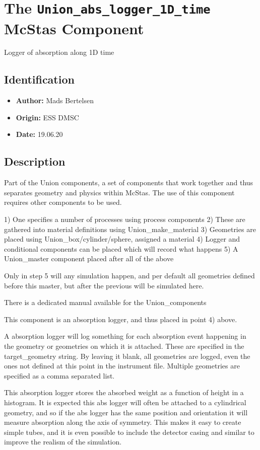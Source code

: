 \section{The \texttt{Union\_abs\_logger\_1D\_time} McStas Component}
Logger of absorption along 1D time

\subsection*{Identification}
\begin{itemize}
  \item \textbf{Author:} Mads Bertelsen
  \item \textbf{Origin:} ESS DMSC
  \item \textbf{Date:} 19.06.20
\end{itemize}

\subsection*{Description}
Part of the Union components, a set of components that work together and thus separates geometry and physics within McStas. The use of this component requires other components to be used.

1) One specifies a number of processes using process components 2) These are gathered into material definitions using Union\_make\_material 3) Geometries are placed using Union\_box/cylinder/sphere, assigned a material 4) Logger and conditional components can be placed which will record what happens 5) A Union\_master component placed after all of the above

Only in step 5 will any simulation happen, and per default all geometries defined before this master, but after the previous will be simulated here.

There is a dedicated manual available for the Union\_components

This component is an absorption logger, and thus placed in point 4) above.

A absorption logger will log something for each absorption event happening in the geometry or geometries on which it is attached. These are specified in the target\_geometry string. By leaving it blank, all geometries are logged, even the ones not defined at this point in the instrument file. Multiple geometries are specified as a comma separated list.

This absorption logger stores the absorbed weight as a function of height in a histogram. It is expected this abs logger will often be attached to a cylindrical geometry, and so if the abs logger has the same position and orientation it will measure absorption along the axis of symmetry. This makes it easy to create simple tubes, and it is even possible to include the detector casing and similar to improve the realism of the simulation.

